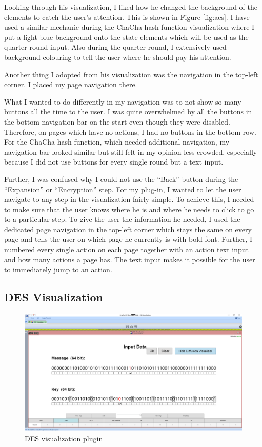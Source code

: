 Looking through his visualization, I liked how he changed the background of the elements to catch the user's attention. This is shown in Figure \ref{fig:aes}. I have used a similar mechanic during the ChaCha hash function visualization where I put a light blue background onto the state elements which will be used as the quarter-round input. Also during the quarter-round, I extensively used background colouring to tell the user where he should pay his attention.

Another thing I adopted from his visualization was the navigation in the top-left corner. I placed my page navigation there.

What I wanted to do differently in my navigation was to not show so many buttons all the time to the user. I was quite overwhelmed by all the buttons in the bottom navigation bar on the start even though they were disabled. Therefore, on pages which have no actions, I had no buttons in the bottom row. For the ChaCha hash function, which needed additional navigation, my navigation bar looked similar but still felt in my opinion less crowded, especially because I did not use buttons for every single round but a text input.

Further, I was confused why I could not use the ``Back'' button during the ``Expansion'' or ``Encryption'' step. For my plug-in, I wanted to let the user navigate to any step in the visualization fairly simple. To achieve this, I needed to make sure that the user knows where he is and where he needs to click to go to a particular step. To give the user the information he needed, I used the dedicated page navigation in the top-left corner which stays the same on every page and tells the user on which page he currently is with bold font. Further, I numbered every single action on each page together with an action text input and how many actions a page has. The text input makes it possible for the user to immediately jump to an action.

\subsection{DES Visualization}
\label{sec:desVisualization}

\begin{figure}
\centering
\includegraphics[width=\textwidth]{figures/ct2/des.png}
\caption{DES visualization plugin}
\label{fig:des}
\end{figure}

